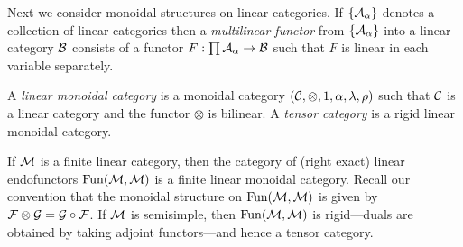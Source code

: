 \documentclass{amsart}
\begin{document}
	
Next we consider monoidal structures on linear categories.	
If $\{\mathcal A_\alpha\}$ denotes a collection of linear categories then a {\em multilinear functor} from $\{\mathcal A_\alpha\}$ into a linear category $\mathcal B$ consists of a functor
$F: \prod \mathcal A_\alpha \to \mathcal B$
such that $F$ is linear in each variable separately. 

\begin{definition}
	A {\em linear monoidal category} is a monoidal category $(\mathcal C, \otimes, 1, \alpha, \lambda, \rho)$ such that $\mathcal C$ is a linear category and the functor $\otimes$ is bilinear. A {\em tensor category} is a rigid linear monoidal category.  
\end{definition}


\begin{example}
	If $\mathcal M$ is a finite linear category, then the category of (right exact) linear endofunctors $\operatorname{Fun}(\mathcal M, \mathcal M)$ is a finite linear monoidal category. Recall our convention that the monoidal structure on $\operatorname{Fun}(\mathcal M, \mathcal M)$ is given by $\mathcal F \otimes \mathcal G = \mathcal G \circ \mathcal F$. If $\mathcal M$ is semisimple, then $\operatorname{Fun}(\mathcal M, \mathcal M)$ is rigid---duals are obtained by taking adjoint functors---and hence a tensor category.  
\end{example} %
\end{document}
